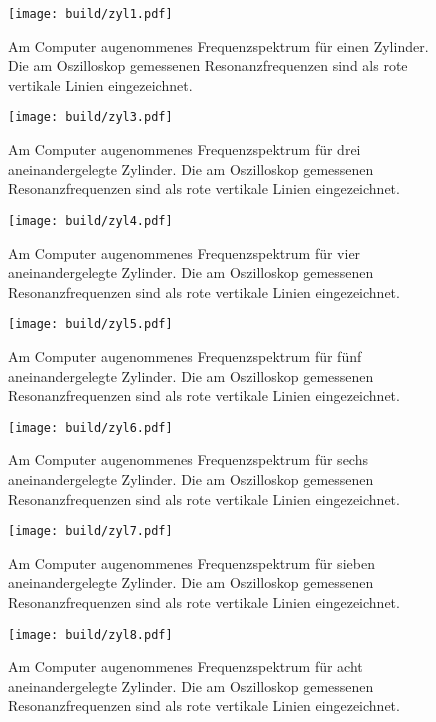 \newpage
{}
\label{sec:Anhang}

\begin{figure}
  \centering
  \texttt{[image: build/zyl1.pdf]}
  \caption{Am Computer augenommenes Frequenzspektrum für einen
  Zylinder. Die am Oszilloskop gemessenen Resonanzfrequenzen sind als rote vertikale
  Linien eingezeichnet.}
  \label{fig:zyl1}
\end{figure}

\begin{figure}
  \centering
  \texttt{[image: build/zyl3.pdf]}
  \caption{Am Computer augenommenes Frequenzspektrum für drei aneinandergelegte
  Zylinder. Die am Oszilloskop gemessenen Resonanzfrequenzen sind als rote vertikale
  Linien eingezeichnet.}
  \label{fig:zyl3}
\end{figure}

\begin{figure}
  \centering
  \texttt{[image: build/zyl4.pdf]}
  \caption{Am Computer augenommenes Frequenzspektrum für vier aneinandergelegte
  Zylinder. Die am Oszilloskop gemessenen Resonanzfrequenzen sind als rote vertikale
  Linien eingezeichnet.}
  \label{fig:zyl4}
\end{figure}

\begin{figure}
  \centering
  \texttt{[image: build/zyl5.pdf]}
  \caption{Am Computer augenommenes Frequenzspektrum für fünf aneinandergelegte
  Zylinder. Die am Oszilloskop gemessenen Resonanzfrequenzen sind als rote vertikale
  Linien eingezeichnet.}
  \label{fig:zyl5}
\end{figure}

\begin{figure}
  \centering
  \texttt{[image: build/zyl6.pdf]}
  \caption{Am Computer augenommenes Frequenzspektrum für sechs aneinandergelegte
  Zylinder. Die am Oszilloskop gemessenen Resonanzfrequenzen sind als rote vertikale
  Linien eingezeichnet.}
  \label{fig:zyl6}
\end{figure}

\begin{figure}
  \centering
  \texttt{[image: build/zyl7.pdf]}
  \caption{Am Computer augenommenes Frequenzspektrum für sieben aneinandergelegte
  Zylinder. Die am Oszilloskop gemessenen Resonanzfrequenzen sind als rote vertikale
  Linien eingezeichnet.}
  \label{fig:zyl7}
\end{figure}

\begin{figure}
  \centering
  \texttt{[image: build/zyl8.pdf]}
  \caption{Am Computer augenommenes Frequenzspektrum für acht aneinandergelegte
  Zylinder. Die am Oszilloskop gemessenen Resonanzfrequenzen sind als rote vertikale
  Linien eingezeichnet.}
  \label{fig:zyl8}
\end{figure}

